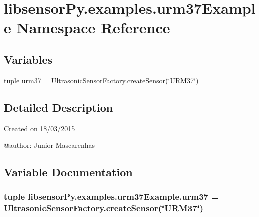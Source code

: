 \hypertarget{namespacelibsensorPy_1_1examples_1_1urm37Example}{}\section{libsensor\+Py.\+examples.\+urm37\+Example Namespace Reference}
\label{namespacelibsensorPy_1_1examples_1_1urm37Example}
\subsection*{Variables}
\begin{DoxyCompactItemize}
\item 
tuple \hyperlink{namespacelibsensorPy_1_1examples_1_1urm37Example_a5dc4e2ed29b93fda6699ddb103f2bf73}{urm37} = \hyperlink{classconcretefactory_1_1ultrasonicSensorFactory_1_1UltrasonicSensorFactory_ade21ba1ce348eb9e5cf8eee3fda4a773}{Ultrasonic\+Sensor\+Factory.\+create\+Sensor}(\char`\"{}U\+R\+M37\char`\"{})
\end{DoxyCompactItemize}


\subsection{Detailed Description}
\begin{DoxyVerb}Created on 18/03/2015

@author: Junior Mascarenhas
\end{DoxyVerb}
 

\subsection{Variable Documentation}
\hypertarget{namespacelibsensorPy_1_1examples_1_1urm37Example_a5dc4e2ed29b93fda6699ddb103f2bf73}{}
\subsubsection[{urm37}]{\setlength{\rightskip}{0pt plus 5cm}tuple libsensor\+Py.\+examples.\+urm37\+Example.\+urm37 = {\bf Ultrasonic\+Sensor\+Factory.\+create\+Sensor}(\char`\"{}U\+R\+M37\char`\"{})}\label{namespacelibsensorPy_1_1examples_1_1urm37Example_a5dc4e2ed29b93fda6699ddb103f2bf73}
